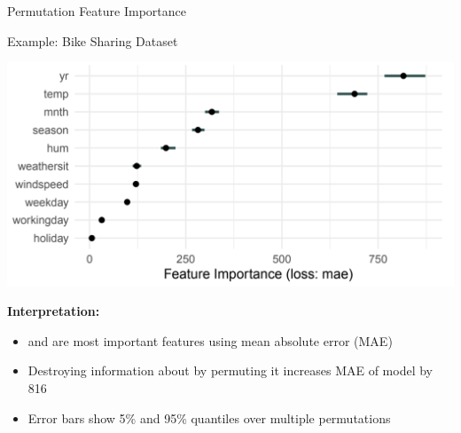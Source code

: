 \documentclass[11pt,compress,t,notes=noshow, aspectratio=169, xcolor=table]{beamer}
\begin{document}
\begin{frame}{Permutation Feature Importance}
\begin{itemize}
  \end{itemize}
\end{frame}

\begin{frame}{Example: Bike Sharing Dataset}

\begin{center}
\includegraphics[width=\textwidth]{figure_man/bike-sharing02.png}
\end{center}

\textbf{Interpretation:}

\begin{itemize}
 \item {} and  are most important features using mean absolute error (MAE)
 \item Destroying information about  by permuting it increases MAE of model by 816
 \item Error bars show 5\% and 95\% quantiles over multiple permutations
\end{itemize}
\end{frame}
\end{document}
